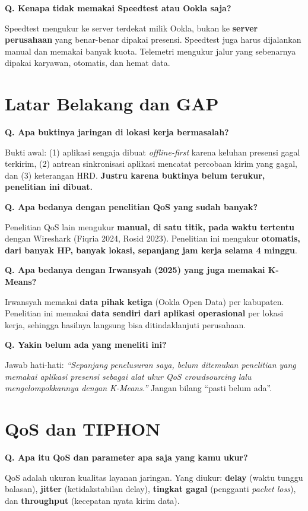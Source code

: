 \documentclass[11pt,a4paper]{article}
\newcounter{q}
\newcommand{\tanya}[2]{\stepcounter{q}%
\par\vspace{6pt}\noindent\colorbox{band}{\parbox{\dimexpr\linewidth-2\fboxsep}{\textbf{Q\arabic{q}. #1}}}\par\vspace{2pt}#2\par}
\begin{document}
\tanya{Kenapa tidak memakai Speedtest atau Ookla saja?}{Speedtest mengukur ke server terdekat milik Ookla, bukan ke \textbf{server perusahaan} yang benar-benar dipakai presensi. Speedtest juga harus dijalankan manual dan memakai banyak kuota. Telemetri mengukur jalur yang sebenarnya dipakai karyawan, otomatis, dan hemat data.}

\section{Latar Belakang dan GAP}

\tanya{Apa buktinya jaringan di lokasi kerja bermasalah?}{Bukti awal: (1) aplikasi sengaja dibuat \textit{offline-first} karena keluhan presensi gagal terkirim, (2) antrean sinkronisasi aplikasi mencatat percobaan kirim yang gagal, dan (3) keterangan HRD. \textbf{Justru karena buktinya belum terukur, penelitian ini dibuat.}}

\tanya{Apa bedanya dengan penelitian QoS yang sudah banyak?}{Penelitian QoS lain mengukur \textbf{manual, di satu titik, pada waktu tertentu} dengan Wireshark (Fiqria 2024, Rosid 2023). Penelitian ini mengukur \textbf{otomatis, dari banyak HP, banyak lokasi, sepanjang jam kerja selama 4 minggu}.}

\tanya{Apa bedanya dengan Irwansyah (2025) yang juga memakai K-Means?}{Irwansyah memakai \textbf{data pihak ketiga} (Ookla Open Data) per kabupaten. Penelitian ini memakai \textbf{data sendiri dari aplikasi operasional} per lokasi kerja, sehingga hasilnya langsung bisa ditindaklanjuti perusahaan.}

\tanya{Yakin belum ada yang meneliti ini?}{Jawab hati-hati: \textit{``Sepanjang penelusuran saya, belum ditemukan penelitian yang memakai aplikasi presensi sebagai alat ukur QoS crowdsourcing lalu mengelompokkannya dengan K-Means.''} Jangan bilang ``pasti belum ada''.}

\section{QoS dan TIPHON}

\tanya{Apa itu QoS dan parameter apa saja yang kamu ukur?}{QoS adalah ukuran kualitas layanan jaringan. Yang diukur: \textbf{delay} (waktu tunggu balasan), \textbf{jitter} (ketidakstabilan delay), \textbf{tingkat gagal} (pengganti \textit{packet loss}), dan \textbf{throughput} (kecepatan nyata kirim data).}
\end{document}
